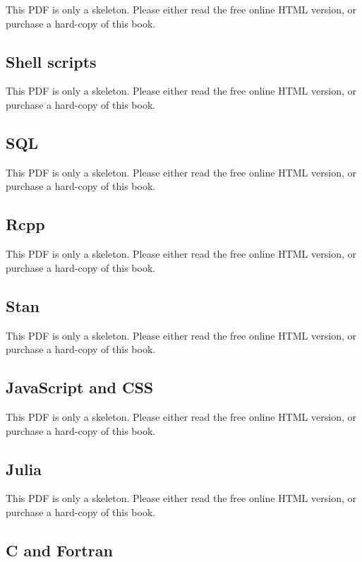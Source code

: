 \documentclass[
  11pt,
]{krantz}
\theoremstyle{definition}
\theoremstyle{definition}
\theoremstyle{definition}
\theoremstyle{definition}
\theoremstyle{remark}
\begin{document}
This PDF is only a skeleton. Please either read the free online HTML version, or purchase a hard-copy of this book.

\subsection{Shell scripts}\label{shell-scripts}

This PDF is only a skeleton. Please either read the free online HTML version, or purchase a hard-copy of this book.

\subsection{SQL}\label{sql}

This PDF is only a skeleton. Please either read the free online HTML version, or purchase a hard-copy of this book.

\subsection{Rcpp}\label{rcpp}

This PDF is only a skeleton. Please either read the free online HTML version, or purchase a hard-copy of this book.

\subsection{Stan}\label{stan}

This PDF is only a skeleton. Please either read the free online HTML version, or purchase a hard-copy of this book.

\subsection{JavaScript and CSS}\label{javascript-and-css}

This PDF is only a skeleton. Please either read the free online HTML version, or purchase a hard-copy of this book.

\subsection{Julia}\label{julia}

This PDF is only a skeleton. Please either read the free online HTML version, or purchase a hard-copy of this book.

\subsection{C and Fortran}\label{c-and-fortran}
\end{document}
